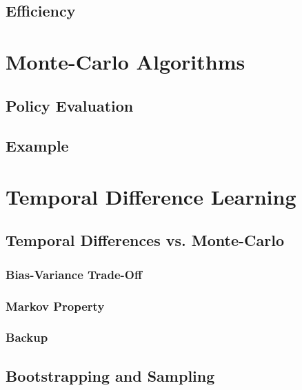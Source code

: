 	\section{Efficiency} %

\chapter{Monte-Carlo Algorithms} %

	\section{Policy Evaluation} %

	\section{Example} %

\chapter{Temporal Difference Learning} %

	\section{Temporal Differences vs. Monte-Carlo} %

		\subsection{Bias-Variance Trade-Off} %

		\subsection{Markov Property} %

		\subsection{Backup} %

	\section{Bootstrapping and Sampling} %

